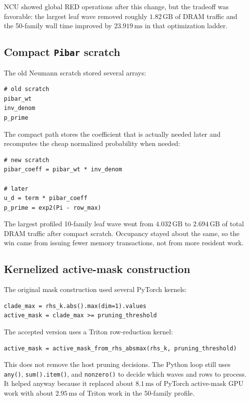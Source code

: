\documentclass[11pt]{article}
\newcommand{\ms}{\,\mathrm{ms}}
\newcommand{\gb}{\,\mathrm{GB}}
\newcommand{\code}[1]{\texttt{#1}}
\begin{document}
NCU showed global RED operations after this change, but the tradeoff was
favorable: the largest leaf wave removed roughly $1.82\gb$ of DRAM traffic and
the 50-family wall time improved by $23.919\ms$ in that optimization ladder.

\subsection{Compact \code{Pibar} scratch}

The old Neumann scratch stored several arrays:

\begin{lstlisting}
# old scratch
pibar_wt
inv_denom
p_prime
\end{lstlisting}

The compact path stores the coefficient that is actually needed later and
recomputes the cheap normalized probability when needed:

\begin{lstlisting}
# new scratch
pibar_coeff = pibar_wt * inv_denom

# later
u_d = term * pibar_coeff
p_prime = exp2(Pi - row_max)
\end{lstlisting}

The largest profiled 10-family leaf wave went from $4.032\gb$ to $2.694\gb$
of total DRAM traffic after compact scratch.  Occupancy stayed about the same,
so the win came from issuing fewer memory transactions, not from more resident
work.

\subsection{Kernelized active-mask construction}

The original mask construction used several PyTorch kernels:

\begin{lstlisting}
clade_max = rhs_k.abs().max(dim=1).values
active_mask = clade_max >= pruning_threshold
\end{lstlisting}

The accepted version uses a Triton row-reduction kernel:

\begin{lstlisting}
active_mask = active_mask_from_rhs_absmax(rhs_k, pruning_threshold)
\end{lstlisting}

This does not remove the host pruning decisions.  The Python loop still uses
\code{any()}, \code{sum().item()}, and \code{nonzero()} to decide which waves
and rows to process.  It helped anyway because it replaced about $8.1\ms$ of
PyTorch active-mask GPU work with about $2.95\ms$ of Triton work in the
50-family profile.
\end{document}
